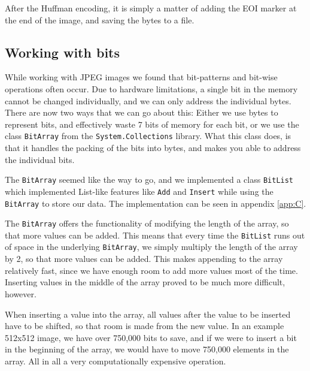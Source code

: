 After the Huffman encoding, it is simply a matter of adding the EOI marker at the end of the image, and saving the bytes to a file. 

\subsection{Working with bits}
While working with JPEG images we found that bit-patterns and bit-wise operations often occur.
Due to hardware limitations, a single bit in the memory cannot be changed individually, and we can only address the individual bytes.
There are now two ways that we can go about this:
Either we use bytes to represent bits, and effectively waste 7 bits of memory for each bit, or we use the class \lstinline|BitArray| from the \lstinline|System.Collections| library.
What this class does, is that it handles the packing of the bits into bytes, and makes you able to address the individual bits.

The \lstinline|BitArray| seemed like the way to go, and we implemented a class \lstinline|BitList| which implemented List-like features like \lstinline|Add| and \lstinline|Insert| while using the \lstinline|BitArray| to store our data.
The implementation can be seen in appendix \ref{app:C}. 

The \lstinline|BitArray| offers the functionality of modifying the length of the array, so that more values can be added.
This means that every time the \lstinline|BitList| runs out of space in the underlying \lstinline|BitArray|, we simply multiply the length of the array by 2, so that more values can be added.
This makes appending to the array relatively fast, since we have enough room to add more values most of the time.
Inserting values in the middle of the array proved to be much more difficult, however.

When inserting a value into the array, all values after the value to be inserted have to be shifted, so that room is made from the new value.
In an example 512x512 image, we have over 750,000 bits to save, and if we were to insert a bit in the beginning of the array, we would have to move 750,000 elements in the array.
All in all a very computationally expensive operation.

